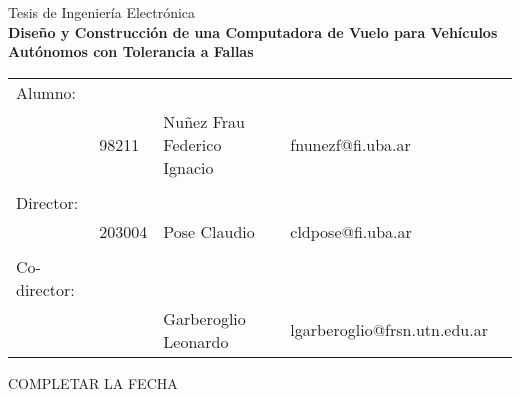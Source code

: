 \newcommand{\HRule}{\rule{\linewidth}{0.5mm}}
\begin{center}
{\LARGE Tesis de Ingeniería Electrónica}\\[0.5cm]
\textbf{\Large Diseño y Construcción de una Computadora de Vuelo para Vehículos Autónomos con Tolerancia a Fallas}\\[0.6cm]
\end{center}

\begin{center}
        \begin{tabular}{lllll}
                Alumno: & & & & \\
                        & 98211 & Nuñez Frau Federico Ignacio & fnunezf@fi.uba.ar & %
                        \\
                & & & & \\
                Director: & & & & \\
                & 203004 & Pose Claudio & cldpose@fi.uba.ar & %
                \\ 
                & & & & \\
                Co-director: & & & & \\
                & %
                & Garberoglio Leonardo & lgarberoglio@frsn.utn.edu.ar & %
                \\ 
        \end{tabular}
\end{center}

\vspace{0.3cm}

\begin{center}
        {\color{red} COMPLETAR LA FECHA}
\end{center}

\vspace{1.0cm}